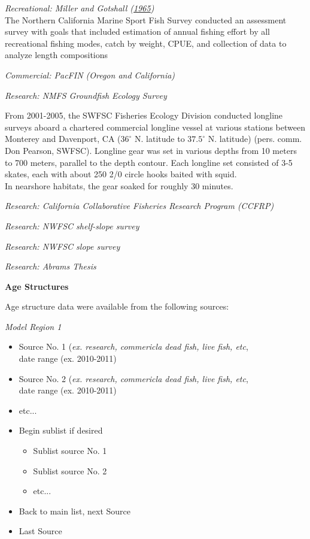\documentclass[12pt,]{article}
\begin{document}
\emph{Recreational: Miller and Gotshall
(\protect\hyperlink{ref-Miller1965}{1965})}\\
The Northern California Marine Sport Fish Survey conducted an assessment
survey with goals that included estimation of annual fishing effort by
all recreational fishing modes, catch by weight, CPUE, and collection of
data to analyze length compositions

\emph{Commercial: PacFIN (Oregon and California)}

\emph{Research: NMFS Groundfish Ecology Survey}

From 2001-2005, the SWFSC Fisheries Ecology Division conducted longline
surveys aboard a chartered commercial longline vessel at various
stations between Monterey and Davenport, CA (\(36^\circ\) N. latitude to
\(37.5^\circ\) N. latitude) (pers. comm. Don Pearson, SWFSC). Longline
gear was set in various depths from 10 meters to 700 meters, parallel to
the depth contour. Each longline set consisted of 3-5 skates, each with
about 250 2/0 circle hooks baited with squid.\\
In nearshore habitats, the gear soaked for roughly 30 minutes.

\emph{Research: California Collaborative Fisheries Research Program
(CCFRP)}

\emph{Research: NWFSC shelf-slope survey}

\emph{Research: NWFSC slope survey}

\emph{Research: Abrams Thesis}

\vspace{.5cm} \textbf{Age Structures}

Age structure data were available from the following sources:

\emph{Model Region 1}

\begin{itemize}[noitemsep,nolistsep,topsep=0pt]
  \item Source No. 1 (\emph{ex. research, commericla dead fish, live fish, etc},\\ 
        date range (ex. 2010-2011)
  \item Source No. 2 (\emph{ex. research, commericla dead fish, live fish, etc},\\
        date range (ex. 2010-2011) 
  \item etc...      
  \item Begin sublist if desired 
    \begin{itemize}[noitemsep,nolistsep]
      \item Sublist source No. 1     
      \item Sublist source No. 2        
      \item etc...     
    \end{itemize}
  \item Back to main list, next Source     
  \item Last Source     
\end{itemize}
\end{document}
